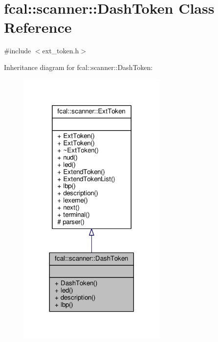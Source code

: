 \hypertarget{classfcal_1_1scanner_1_1DashToken}{}\section{fcal\+:\+:scanner\+:\+:Dash\+Token Class Reference}
\label{classfcal_1_1scanner_1_1DashToken}


{\ttfamily \#include $<$ext\+\_\+token.\+h$>$}



Inheritance diagram for fcal\+:\+:scanner\+:\+:Dash\+Token\+:
\nopagebreak
\begin{figure}[H]
\begin{center}
\leavevmode
\includegraphics[width=209pt]{classfcal_1_1scanner_1_1DashToken__inherit__graph}
\end{center}
\end{figure}


